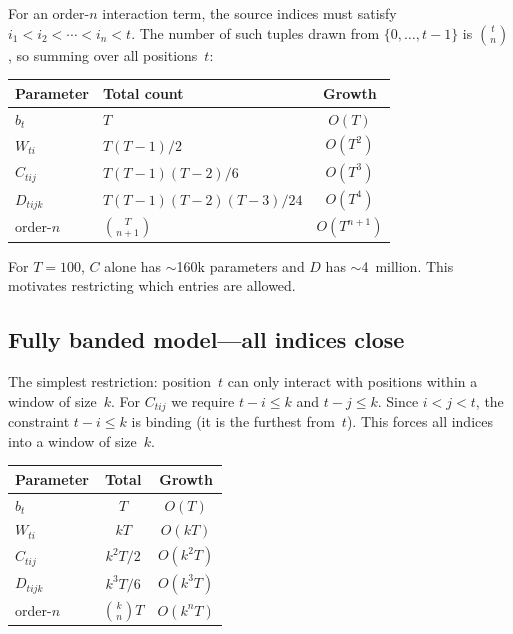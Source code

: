\documentclass[11pt]{article}
\begin{document}
For an order-$n$ interaction term, the source indices must satisfy
$i_1 < i_2 < \cdots < i_n < t$.  The number of such tuples drawn from
$\{0, \ldots, t-1\}$ is $\binom{t}{n}$, so summing over all
positions~$t$:

\begin{center}
\begin{tabular}{llc}
\toprule
Parameter & Total count & Growth \\
\midrule
$b_t$           & $T$                     & $O(T)$     \\
$W_{ti}$        & $T(T-1)/2$              & $O(T^2)$   \\
$C_{tij}$       & $T(T-1)(T-2)/6$         & $O(T^3)$   \\
$D_{tijk}$      & $T(T-1)(T-2)(T-3)/24$   & $O(T^4)$   \\
order-$n$       & $\binom{T}{n+1}$        & $O(T^{n+1})$ \\
\bottomrule
\end{tabular}
\end{center}

For $T = 100$, $C$ alone has $\sim$160k parameters and $D$ has
$\sim$4~million.  This motivates restricting which entries are allowed.

\subsection{Fully banded model---all indices close}

The simplest restriction: position~$t$ can only interact with positions
within a window of size~$k$.  For $C_{tij}$ we require
$t - i \leq k$ and $t - j \leq k$.  Since $i < j < t$, the constraint
$t - i \leq k$ is binding (it is the furthest from~$t$).  This forces
all indices into a window of size~$k$.

\begin{center}
\begin{tabular}{lcc}
\toprule
Parameter & Total & Growth \\
\midrule
$b_t$      & $T$       & $O(T)$      \\
$W_{ti}$   & $kT$      & $O(kT)$     \\
$C_{tij}$  & $k^2 T/2$ & $O(k^2 T)$  \\
$D_{tijk}$ & $k^3 T/6$ & $O(k^3 T)$  \\
order-$n$  & $\binom{k}{n} T$ & $O(k^n T)$ \\
\bottomrule
\end{tabular}
\end{center}
\end{document}
